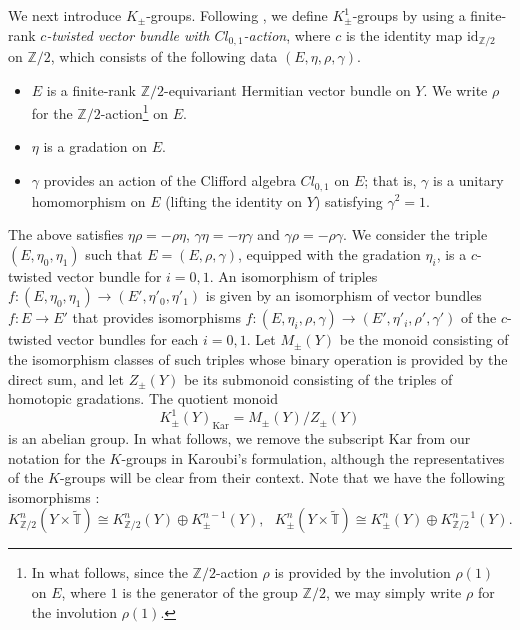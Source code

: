 \documentclass{amsart}
\theoremstyle{plain}
\theoremstyle{definition}
\theoremstyle{remark}
\newcommand{\Z}{\mathbb{Z}}
\newcommand{\T}{\mathbb{T}}
\newcommand{\id}{\mathrm{id}}
\newcommand{\tT}{\widetilde{\T}}
\newcommand{\Kar}{\mathrm{Kar}}
\begin{document}
We next introduce $K_\pm$-groups.
Following \cite{Gomi23}, we define $K^1_{\pm}$-groups by using a finite-rank {\em $c$-twisted vector bundle with $Cl_{0,1}$-action}, where $c$ is the identity map $\id_{\Z/2}$ on $\Z/2$, which consists of the following data $(E, \eta, \rho, \gamma)$.
\begin{itemize}
\item $E$ is a finite-rank $\Z/2$-equivariant Hermitian vector bundle on $Y$. We write $\rho$ for the $\Z/2$-action\footnote{In what follows, since the $\Z/2$-action $\rho$ is provided by the involution $\rho(1)$ on $E$, where $1$ is the generator of the group $\Z/2$, we may simply write $\rho$ for the involution $\rho(1)$.} on $E$.
\item $\eta$ is a gradation on $E$.
\item $\gamma$ provides an action of the Clifford algebra $Cl_{0,1}$ on $E$; that is, $\gamma$ is a unitary homomorphism on $E$ (lifting the identity on $Y$) satisfying $\gamma^2=1$.
\end{itemize}
The above satisfies $\eta \rho = - \rho \eta$, $\gamma \eta = - \eta \gamma$ and $\gamma \rho = - \rho \gamma$.
We consider the triple $(E, \eta_0, \eta_1)$ such that $E = (E, \rho, \gamma)$, equipped with the gradation $\eta_i$, is a $c$-twisted vector bundle for $i=0,1$.
An isomorphism of triples $f \colon (E, \eta_0, \eta_1) \to (E', \eta'_0, \eta'_1)$ is given by an isomorphism of vector bundles $f \colon E \to E'$ that provides isomorphisms $f \colon (E, \eta_i, \rho, \gamma) \to (E', \eta'_i, \rho', \gamma')$ of the $c$-twisted vector bundles for each $i=0,1$.
Let $M_\pm(Y)$ be the monoid consisting of the isomorphism classes of such triples whose binary operation is provided by the direct sum, and let $Z_\pm(Y)$ be its submonoid consisting of the triples of homotopic gradations.
The quotient monoid
\begin{equation*}
	K^1_{\pm}(Y)_{\Kar} = M_{\pm}(Y) / Z_{\pm}(Y)
\end{equation*}
is an abelian group.
In what follows, we remove the subscript $\mathrm{Kar}$ from our notation for the $K$-groups in Karoubi's formulation, although the representatives of the $K$-groups will be clear from their context.
Note that we have the following isomorphisms \cite{Gomi15}:
\begin{equation}
\label{isom}
	K^n_{\Z/2}(Y \times \tT) \cong K^n_{\Z/2}(Y) \oplus K^{n-1}_{\pm}(Y), \ \ \
	K^n_{\pm}(Y \times \tT) \cong K^n_{\pm}(Y) \oplus K^{n-1}_{\Z/2}(Y).
\end{equation}
\end{document}
